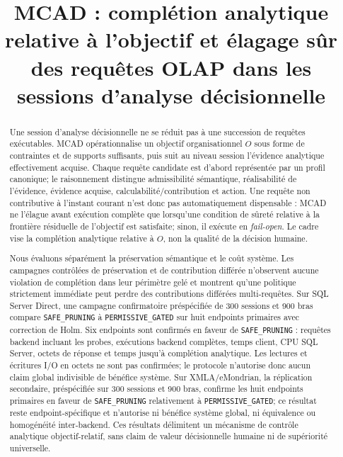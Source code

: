 \documentclass[journal]{IEEEtran}
\begin{document}
\title{MCAD : complétion analytique relative à l'objectif et élagage sûr des requêtes OLAP dans les sessions d'analyse décisionnelle}

\author{}

\maketitle
\pagestyle{plain}
\thispagestyle{plain}

\begin{abstract}
Une session d'analyse décisionnelle ne se réduit pas à une succession de requêtes exécutables. MCAD opérationnalise un objectif organisationnel $O$ sous forme de contraintes et de supports suffisants, puis suit au niveau session l'évidence analytique effectivement acquise. Chaque requête candidate est d'abord représentée par un profil canonique; le raisonnement distingue admissibilité sémantique, réalisabilité de l'évidence, évidence acquise, calculabilité/contribution et action. Une requête non contributive à l'instant courant n'est donc pas automatiquement dispensable : MCAD ne l'élague avant exécution complète que lorsqu'une condition de sûreté relative à la frontière résiduelle de l'objectif est satisfaite; sinon, il exécute en \emph{fail-open}. Le cadre vise la complétion analytique relative à $O$, non la qualité de la décision humaine.

Nous évaluons séparément la préservation sémantique et le coût système. Les campagnes contrôlées de préservation et de contribution différée n'observent aucune violation de complétion dans leur périmètre gelé et montrent qu'une politique strictement immédiate peut perdre des contributions différées multi-requêtes. Sur SQL Server Direct, une campagne confirmatoire préspécifiée de 300 sessions et 900 bras compare \texttt{SAFE\_PRUNING} à \texttt{PERMISSIVE\_GATED} sur huit endpoints primaires avec correction de Holm. Six endpoints sont confirmés en faveur de \texttt{SAFE\_PRUNING} : requêtes backend incluant les probes, exécutions backend complètes, temps client, CPU SQL Server, octets de réponse et temps jusqu'à complétion analytique. Les lectures et écritures I/O en octets ne sont pas confirmées; le protocole n'autorise donc aucun claim global indivisible de bénéfice système. Sur XMLA/eMondrian, la réplication secondaire, préspécifiée sur 300 sessions et 900 bras, confirme les huit endpoints primaires en faveur de \texttt{SAFE\_PRUNING} relativement à \texttt{PERMISSIVE\_GATED}; ce résultat reste endpoint-spécifique et n'autorise ni bénéfice système global, ni équivalence ou homogénéité inter-backend. Ces résultats délimitent un mécanisme de contrôle analytique objectif-relatif, sans claim de valeur décisionnelle humaine ni de supériorité universelle.
\end{abstract}
\end{document}
